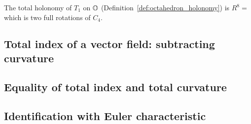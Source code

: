 \begin{myex}
The total holonomy of \( T_1 \) on \( \mathbb{O} \) (Definition~\ref{def:octahedron_holonomy}) is \( R^8=\) which is two full rotations of \( C_4 \).
\end{myex}



\subsection{Total index of a vector field: subtracting curvature}

\subsection{Equality of total index and total curvature}

\subsection{Identification with Euler characteristic}


